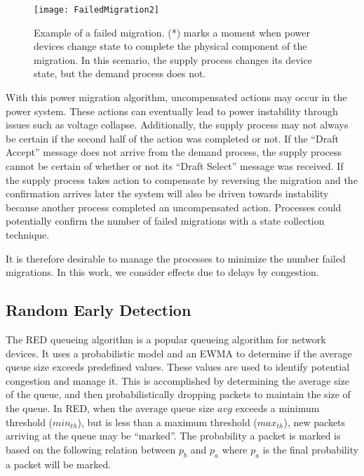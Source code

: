 \begin{figure}
\centering
\texttt{[image: FailedMigration2]}
\caption{Example of a failed migration. (*) marks a moment when power devices change state to complete the physical component of the migration. In this scenario, the supply process changes its device state, but the demand process does not.}
\label{fig:failed-migration-2}
\end{figure}

With this power migration algorithm, uncompensated actions may occur in the power system.
These actions can eventually lead to power instability through issues such as voltage collapse.
Additionally, the supply process may not always be certain if the second half of the action was completed or not.
If the ``Draft Accept'' message does not arrive from the demand process, the supply process cannot be certain of whether or not its ``Draft Select'' message was received.
If the supply process takes action to compensate by reversing the migration and the confirmation arrives later the system will also be driven towards instability because another process completed an uncompensated action.
Processes could potentially confirm the number of failed migrations with a state collection technique.

It is therefore desirable to manage the processes to minimize the number failed migrations.
In this work, we consider effects due to delays by congestion.

\subsection{Random Early Detection}
The \ac{RED} queueing algorithm is a popular queueing algorithm for network devices.
It uses a probabilistic model and an \ac{EWMA} to determine if the average queue size exceeds predefined values.
These values are used to identify potential congestion and manage it.
This is accomplished by determining the average size of the queue, and then probabilistically dropping packets to maintain the size of the queue.
In \ac{RED}, when the average queue size $avg$ exceeds a minimum threshold ($min_{th}$), but is less than a maximum threshold ($max_{th}$), new packets arriving at the queue may be ``marked''.
The probability a packet is marked is based on the following relation between $p_{b}$ and $p_{a}$ where $p_{a}$ is the final probability a packet will be marked.

